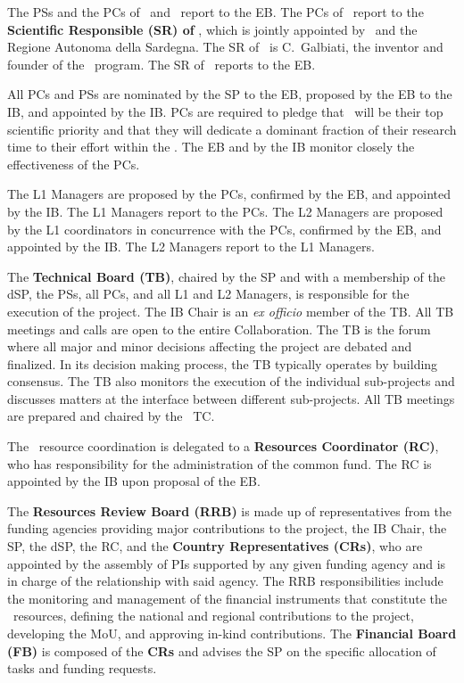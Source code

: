 The PSs and the PCs of \DSks\ and \Urania\ report to the EB.  The PCs of \Aria\ report to the {\bf Scientific Responsible (SR) of \Aria}, which is jointly appointed by \INFN\ and the Regione Autonoma della Sardegna.  The SR of \Aria\ is C.~Galbiati, the inventor and founder of the \Aria\ program.  The SR of \Aria\ reports to the EB.

All PCs and PSs are nominated by the SP to the EB, proposed by the EB to the IB, and appointed by the IB.  PCs are required to pledge that \DSks\ will be their top scientific priority and that they will dedicate a dominant fraction of their research time to their effort within the \GADMC.  The EB and by the IB monitor closely the effectiveness of the PCs.

The L1 Managers are proposed by the PCs, confirmed by the EB, and appointed by the IB.  The L1 Managers report to the PCs.  The L2 Managers are proposed by the L1 coordinators in concurrence with the PCs, confirmed by the EB, and appointed by the IB.  The L2 Managers report to the L1 Managers.

The {\bf Technical Board (TB)}, chaired by the SP and with a membership of the dSP, the PSs, all PCs, and all L1 and L2 Managers, is responsible for the execution of the project.  The IB Chair is an {\it ex officio} member of the TB.  All TB meetings and calls are open to the entire Collaboration.  The TB is the forum where all major and minor decisions affecting the project are debated and finalized.  In its decision making process, the TB typically operates by building consensus.  The TB also monitors the execution of the individual sub-projects and discusses matters at the interface between different sub-projects.  All TB meetings are prepared and chaired by the \DSks\ TC.

The \DS\ resource coordination is delegated to a {\bf Resources Coordinator (RC)}, who has responsibility for the administration of the common fund.  The RC is appointed by the IB upon proposal of the EB.
  
The {\bf Resources Review Board (RRB)} is made up of representatives from the funding agencies providing major contributions to the project, the IB Chair, the SP, the dSP, the RC, and the {\bf Country Representatives (CRs)}, who are appointed by the assembly of PIs supported by any given funding agency and is in charge of the relationship with said agency. The RRB responsibilities include the monitoring and management of the financial instruments that constitute the \GADMC\ resources, defining the national and regional contributions to the project, developing the MoU, and approving in-kind contributions.  The {\bf Financial Board (FB)} is composed of the {\bf CRs} and advises the SP on the specific allocation of tasks and funding requests.

